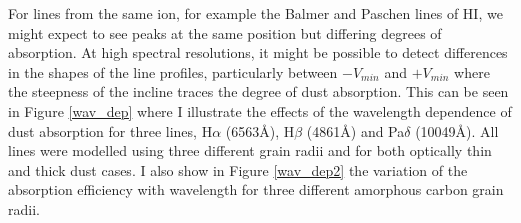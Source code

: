 For lines from the same ion, for example the Balmer and Paschen lines of 
HI, we might expect to see peaks at the same position but differing 
degrees of absorption. At high spectral resolutions, it might be possible 
to detect differences in the shapes of the line profiles, particularly 
between $-V_{min}$ and $+V_{min}$ where the steepness of the incline 
traces the degree of dust absorption.  This can be seen in Figure 
\ref{wav_dep} where I illustrate the effects of the wavelength dependence 
of dust absorption for three lines, H$\alpha$ (6563\AA), H$\beta$ 
(4861\AA) and Pa$\delta$ (10049\AA).  All lines were modelled using three 
different grain radii and for both optically thin and thick dust cases.  
I also show in Figure \ref{wav_dep2} the variation of the absorption efficiency with wavelength 
for three different amorphous carbon grain radii.
%
%
